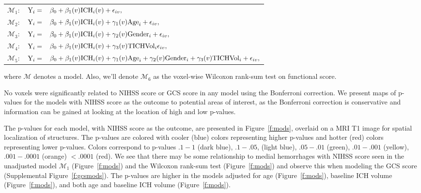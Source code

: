\documentclass[10pt]{article}\usepackage[]{graphicx}\usepackage[]{color}
\begin{document}
\vspace{0.1in}
\begin{tabular}{rll}
\noindent $\mathcal{M}_1:$ & $ {\rm Y}_i =$ & \hspace{-0.18in} $\beta_0+\beta_1(v) {\rm ICH}_i(v) + \epsilon_{iv}, $\\
$\mathcal{M}_2:$ & $ {\rm Y}_i = $ & \hspace{-0.18in} $ \beta_0+\beta_1(v) {\rm ICH}_i(v) + \gamma_1(v){\rm Age}_i + \epsilon_{iv}, $\\
$\mathcal{M}_3:$ & $ {\rm Y}_i = $ & \hspace{-0.18in} $ \beta_0+\beta_1(v) {\rm ICH}_i(v) + \gamma_2(v){\rm Gender}_i + \epsilon_{iv}, $\\
$\mathcal{M}_4:$ &$  {\rm Y}_i = $ & \hspace{-0.18in} $ \beta_0+\beta_1(v) {\rm ICH}_i(v) + \gamma_3(v){\rm TICHVol}_i \epsilon_{iv},$ \\
$\mathcal{M}_5:$ &$  {\rm Y}_i = $ & \hspace{-0.18in} $ \beta_0+\beta_1(v) {\rm ICH}_i(v) + \gamma_1(v){\rm Age}_i  +\gamma_2(v){\rm Gender}_i +\gamma_3(v){\rm TICHVol}_i + \epsilon_{iv},$ \\
\end{tabular}
\vspace{0.1in}
\newline
where $\mathcal{M}$ denotes a model.  Also, we'll denote $\mathcal{M}_6$ as the voxel-wise Wilcoxon rank-sum test on functional score.  

No voxels were significantly related to NIHSS score or GCS score in any model using the Bonferroni correction.  We present maps of p-values for the models with NIHSS score as the outcome to potential areas of interest, as the Bonferroni correction is conservative and information can be gained at looking at the location of high and low p-values. 

The p-values for each model, with NIHSS score as the outcome, are presented in Figure~\ref{f:mods}, overlaid on a MRI T1 image for spatial localization of structures.  The p-values are colored with cooler (blue) colors representing higher p-values and hotter (red) colors representing lower p-values.  Colors correspond to p-values $.1-1$ (dark blue), $.1-.05$, (light blue), $.05-.01$ (green), $.01-.001$ (yellow),  $.001-.0001$ (orange) $< .0001$ (red).  We see that there may be some relationship to medial hemorrhages with NIHSS score seen in the unadjusted model $\mathcal{M}_1$ (Figure~\ref{f:mods}\protect{}) and the Wilcoxon rank-sum test (Figure~\ref{f:mods}\protect{}) and observe this when modeling the GCS score (Supplemental Figure~\ref{f:gcsmods}).  The p-values are higher in the models adjusted for age (Figure~\ref{f:mods}\protect{}), baseline ICH volume (Figure~\ref{f:mods}\protect{}), and both age and baseline ICH volume (Figure~\ref{f:mods}\protect{}).  
\end{document}
